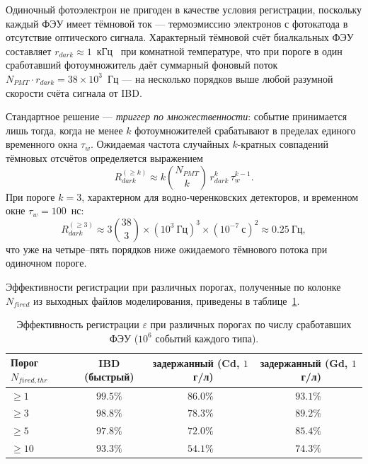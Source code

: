 \documentclass[a4paper,12pt]{extarticle}
\begin{document}
Одиночный фотоэлектрон не пригоден в качестве условия регистрации, поскольку каждый ФЭУ имеет тёмновой ток --- термоэмиссию электронов с фотокатода в отсутствие оптического сигнала. Характерный тёмновой счёт биалкальных ФЭУ составляет $r_{dark}\approx 1$~кГц~\cite{knoll2010} при комнатной температуре, что при пороге в один сработавший фотоумножитель даёт суммарный фоновый поток $N_{PMT}\cdot r_{dark}=38\times 10^3$~Гц --- на несколько порядков выше любой разумной скорости счёта сигнала от IBD.

Стандартное решение --- \textit{триггер по множественности}: событие принимается лишь тогда, когда не менее $k$ фотоумножителей срабатывают в пределах единого временного окна $\tau_w$. Ожидаемая частота случайных $k$-кратных совпадений тёмновых отсчётов определяется выражением
\begin{equation}
    R_{dark}^{(\ge k)} \approx k\binom{N_{PMT}}{k}\,r_{dark}^{k}\,\tau_w^{k-1}.
    \label{eq:dark_rate}
\end{equation}
При пороге $k=3$, характерном для водно-черенковских детекторов, и временном окне $\tau_w=100$~нс:
\begin{equation}
    R_{dark}^{(\ge 3)} \approx 3\binom{38}{3}\times(10^3~\text{Гц})^3\times(10^{-7}~\text{с})^2 \approx 0.25~\text{Гц},
\end{equation}
что уже на четыре--пять порядков ниже ожидаемого тёмнового потока при одиночном пороге.

Эффективности регистрации при различных порогах, полученные по колонке $N_{fired}$ из выходных файлов моделирования, приведены в таблице~\ref{tab:trigger}.

\begin{table}[h]
\centering
\caption{Эффективность регистрации $\varepsilon$ при различных порогах по числу сработавших ФЭУ ($10^6$ событий каждого типа).}
\label{tab:trigger}
\begin{tabular}{lccc}
\toprule
Порог $N_{fired,thr}$ & IBD (быстрый) & задержанный (Cd, $1$~г/л) & задержанный (Gd, $1$~г/л) \\
\midrule
$\ge 1$  & $99.5\%$ & $86.0\%$ & $93.1\%$ \\
$\ge 3$  & $98.8\%$ & $78.3\%$ & $89.2\%$ \\
$\ge 5$  & $97.8\%$ & $72.0\%$ & $85.4\%$ \\
$\ge 10$ & $93.3\%$ & $54.1\%$ & $74.3\%$ \\
\bottomrule
\end{tabular}
\end{table}
\end{document}
